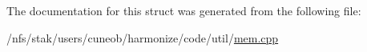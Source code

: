 The documentation for this struct was generated from the following file\-:\begin{DoxyCompactItemize}
\item 
/nfs/stak/users/cuneob/harmonize/code/util/\hyperlink{mem_8cpp}{mem.\-cpp}\end{DoxyCompactItemize}
